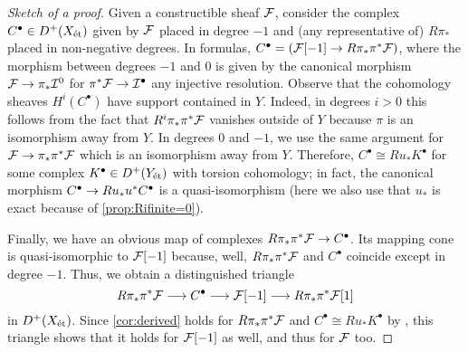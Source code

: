 \documentclass[a4paper, 10pt, oneside, DIV=9, chapterprefix=true, numbers=enddot, bibliography=totoc]{scrbook}
\begin{document}
\begin{proof}[Sketch of a proof]
	Given a constructible sheaf $\mathcal{F}$, consider the complex $C^\bullet\in D^+(X_{\mathrm{\acute{e}t}})$ given by $\mathcal{F}$ placed in degree $-1$ and (any representative of) $R\pi_*$ placed in non-negative degrees. In formulas, $C^\bullet=(\Ff[-1]\morphism R\pi_*\pi^*\Ff)$, where the morphism between degrees $-1$ and $0$ is given by the canonical morphism $\Ff\morphism \pi_*\Ii^0$ for $\pi^*\Ff\morphism \Ii^\bullet$ any injective resolution. Observe that the cohomology sheaves $H^i(C^\bullet)$ have support contained in $Y$. Indeed, in degrees $i>0$ this follows from the fact that $R^i\pi_*\pi^*\mathcal{F}$ vanishes outside of $Y$ because $\pi$ is an isomorphism away from $Y$. In degrees $0$ and $-1$, we use the same argument for $\Ff\morphism \pi_*\pi^*\Ff$ which is an isomorphism away from $Y$. Therefore, $C^\bullet\cong Ru_*K^\bullet$ for some complex $K^\bullet\in D^+(Y_{\mathrm{\acute{e}t}})$ with torsion cohomology; in fact, the canonical morphism $C^\bullet\morphism Ru_*u^*C^\bullet$ is a quasi-isomorphism (here we also use that $u_*$ is exact because of \cref{prop:Rifinite=0}).
	
	Finally, we have an obvious map of complexes $R\pi_*\pi^*\Ff\morphism C^\bullet$. Its mapping cone is quasi-isomorphic to $\mathcal{F}[-1]$ because, well, $R\pi_*\pi^*\mathcal{F}$ and $C^\bullet$ coincide except in degree $-1$. Thus, we obtain a distinguished triangle
	\begin{equation*}
		R\pi_*\pi^*\Ff\morphism C^\bullet\morphism \Ff[-1]\morphism R\pi_*\pi^*\Ff[1]
	\end{equation*}
	in $D^+(X_{\mathrm{\acute{e}t}})$. Since \cref{cor:derived} holds for $R\pi_*\pi^*\mathcal{F}$ and $C^\bullet\cong Ru_*K^\bullet$ by \itememph{*}, this triangle shows that it holds for $\mathcal{F}[-1]$ as well, and thus for $\mathcal{F}$ too. 
\end{proof}
\end{document}
